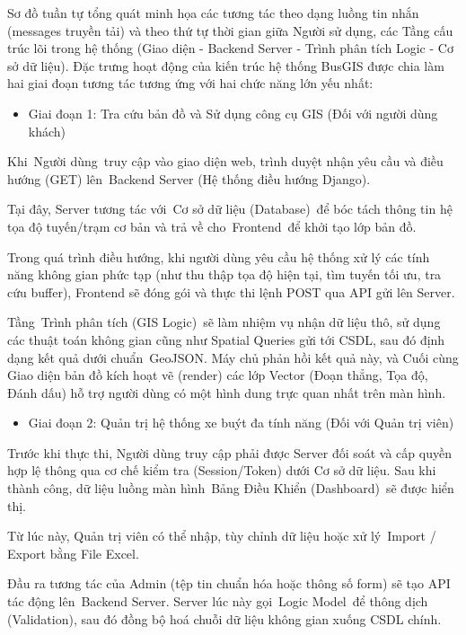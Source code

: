 \documentclass[13pt,a4paper]{report}
\begin{document}
Sơ đồ tuần tự tổng quát minh họa các tương tác theo dạng luồng tin nhắn (messages truyền tải) và theo thứ tự thời gian giữa Người sử dụng, các Tầng cấu trúc lõi trong hệ thống (Giao diện - Backend Server - Trình phân tích Logic - Cơ sở dữ liệu). Đặc trưng hoạt động của kiến trúc hệ thống BusGIS được chia làm hai giai đoạn tương tác tương ứng với hai chức năng lớn yếu nhất:

\begin{itemize}
    \item Giai đoạn 1: Tra cứu bản đồ và Sử dụng công cụ GIS (Đối với người dùng khách)
\end{itemize}

Khi Người dùng truy cập vào giao diện web, trình duyệt nhận yêu cầu và điều hướng (GET) lên Backend Server (Hệ thống điều hướng Django).

Tại đây, Server tương tác với Cơ sở dữ liệu (Database) để bóc tách thông tin hệ tọa độ tuyến/trạm cơ bản và trả về cho Frontend để khởi tạo lớp bản đồ.

Trong quá trình điều hướng, khi người dùng yêu cầu hệ thống xử lý các tính năng không gian phức tạp (như thu thập tọa độ hiện tại, tìm tuyến tối ưu, tra cứu buffer), Frontend sẽ đóng gói và thực thi lệnh POST qua API gửi lên Server.

Tầng Trình phân tích (GIS Logic) sẽ làm nhiệm vụ nhận dữ liệu thô, sử dụng các thuật toán không gian cũng như Spatial Queries gửi tới CSDL, sau đó định dạng kết quả dưới chuẩn GeoJSON. Máy chủ phản hồi kết quả này, và Cuối cùng Giao diện bản đồ kích hoạt vẽ (render) các lớp Vector (Đoạn thẳng, Tọa độ, Đánh dấu) hỗ trợ người dùng có một hình dung trực quan nhất trên màn hình.

\begin{itemize}
    \item Giai đoạn 2: Quản trị hệ thống xe buýt đa tính năng (Đối với Quản trị viên)
\end{itemize}

Trước khi thực thi, Người dùng truy cập phải được Server đối soát và cấp quyền hợp lệ thông qua cơ chế kiểm tra (Session/Token) dưới Cơ sở dữ liệu. Sau khi thành công, dữ liệu luồng màn hình Bảng Điều Khiển (Dashboard) sẽ được hiển thị.

Từ lúc này, Quản trị viên có thể nhập, tùy chỉnh dữ liệu hoặc xử lý Import / Export bằng File Excel.

Đầu ra tương tác của Admin (tệp tin chuẩn hóa hoặc thông số form) sẽ tạo API tác động lên Backend Server. Server lúc này gọi Logic Model để thông dịch (Validation), sau đó đồng bộ hoá chuỗi dữ liệu không gian xuống CSDL chính.
\end{document}
